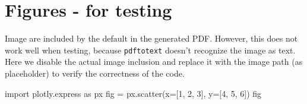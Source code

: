\documentclass{book}
\begin{document}
\chapter{Figures - for testing}

Image are included by the default in the generated PDF. However, this does not work well when testing, because \texttt{pdftotext} doesn't recognize the image as text. Here we disable the actual image inclusion and replace it with the image path (as placeholder) to verify the correctness of the code.

\begin{pycell}
import plotly.express as px
fig = px.scatter(x=[1, 2, 3], y=[4, 5, 6])
fig
\end{pycell}
\ifPythonTeXLoaded
{}
\else
\fi
\end{document}
